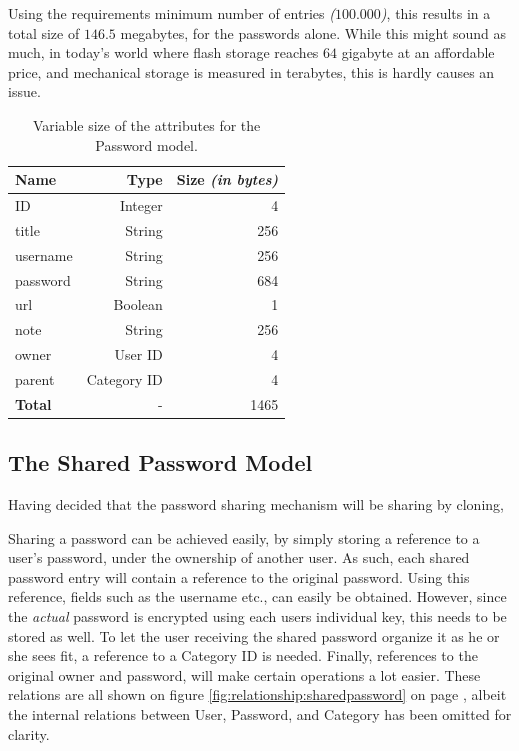 				Using the requirements minimum number of entries \emph{($100.000$)}, this results in a total size of $146.5$ megabytes, for the passwords alone. While this might sound as much, in today's world where flash storage reaches $64$ gigabyte at an affordable price, and mechanical storage is measured in terabytes, this is hardly causes an issue.

				\begin{table}
					\centering
					\begin{tabular}{l | r | r}
						\textbf{Name}  			& \textbf{Type} 		& \textbf{Size \emph{(in bytes)}} 		\\
						\hline
						ID 						& Integer 			& 4						\\
						title 					& String 			& 256					\\
						username 				& String 			& 256					\\
						password 				& String 			& 684					\\
						url						& Boolean 			& 1						\\
						note  					& String 			& 256					\\
						owner 					& User ID 			& 4						\\
						parent 					& Category ID 		& 4						\\
						\hline\hline
						\textbf{Total} 			& - 				& 1465
					\end{tabular}
					\caption{Variable size of the attributes for the Password model.}
					\label{tab:model:password:size}
				\end{table}


		\subsection{The Shared Password Model}
			Having decided that the password sharing mechanism will be sharing by cloning, 

			Sharing a password can be achieved easily, by simply storing a reference to a user's password, under the ownership of another user. As such, each shared password entry will contain a reference to the original password. Using this reference, fields such as the username etc., can easily be obtained. However, since the \emph{actual} password is encrypted using each users individual key, this needs to be stored as well. To let the user receiving the shared password organize it as he or she sees fit, a reference to a Category ID is needed. Finally, references to the original owner and password, will make certain operations a lot easier. These relations are all shown on figure \ref{fig:relationship:sharedpassword} on page \pageref{fig:relationship:sharedpassword}, albeit the internal relations between User, Password, and Category has been omitted for clarity.

